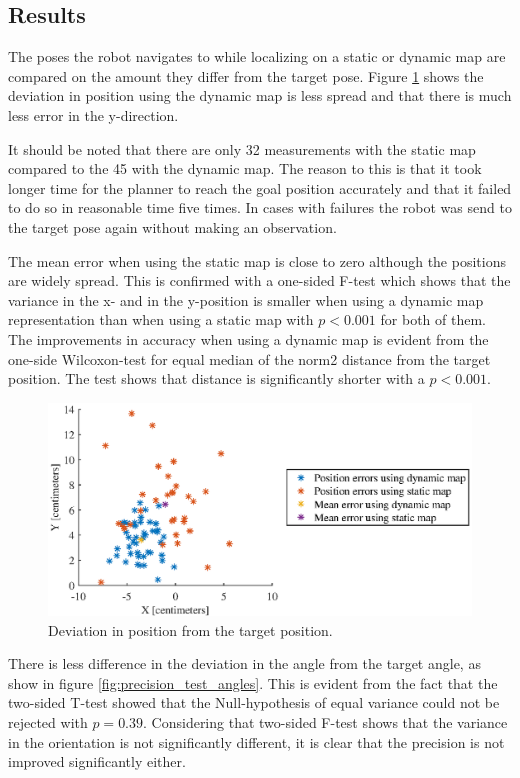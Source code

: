 \subsection{Results}
The poses the robot navigates to while localizing on a static or dynamic map are compared on the amount they differ from the target pose.
Figure \ref{fig:precision_test_positions} shows the deviation in position using the dynamic map is less spread and that there is much less error in the y-direction. 

It should be noted that there are only 32 measurements with the static map compared to the 45 with the dynamic map.
The reason to this is that it took longer time for the planner to reach the goal position accurately and that it failed to do so in reasonable time five times. 
In cases with failures the robot was send to the target pose again without making an observation. 

The mean error when using the static map is close to zero although the positions are widely spread.
This is confirmed with a one-sided F-test which shows that the variance in the x- and in the y-position is smaller when using a dynamic map representation than when using a static map with $p<0.001$ for both of them.
The improvements in accuracy when using a dynamic map is evident from the one-side Wilcoxon-test for equal median of the norm2 distance from the target position. The test shows that distance is significantly shorter with a $p<0.001$.

\begin{figure}
    \centering
    \includegraphics[scale=1]{chapters/evaluation/figures/precision_test_positions}
    \caption{Deviation in position from the target position.}
    \label{fig:precision_test_positions}
\end{figure}

There is less difference in the deviation in the angle from the target angle, as show in figure \ref{fig:precision_test_angles}. This is evident from the fact that the two-sided T-test showed that the Null-hypothesis of equal variance could not be rejected with $p=0.39$.
Considering that two-sided F-test shows that the variance in the orientation is not significantly different, it is clear that the precision is not improved significantly either.

